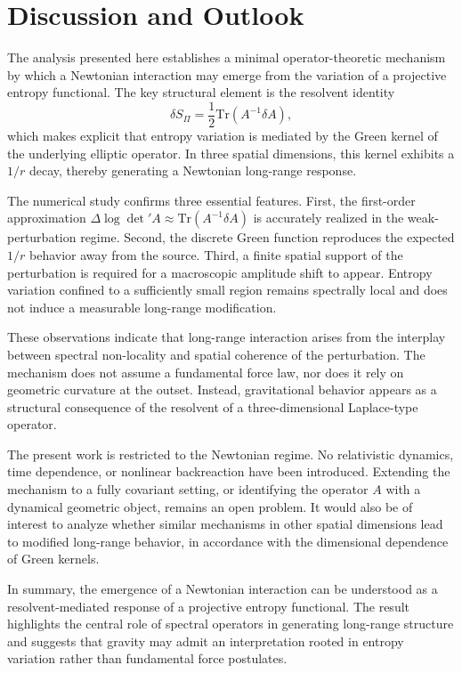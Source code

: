 \section{Discussion and Outlook}
  \label{sec:discussion-and-outlook}

  The analysis presented here establishes a minimal operator-theoretic
  mechanism by which a Newtonian interaction may emerge from the variation
  of a projective entropy functional.
  The key structural element is the resolvent identity
  \begin{equation}
    \delta S_\Pi = \frac12 \mathrm{Tr}(A^{-1}\delta A),
  \end{equation}
  which makes explicit that entropy variation is mediated by the Green kernel
  of the underlying elliptic operator.
  In three spatial dimensions, this kernel exhibits a $1/r$ decay,
  thereby generating a Newtonian long-range response.

  The numerical study confirms three essential features.
  First, the first-order approximation
  $\Delta \log \det{}' A \approx \mathrm{Tr}(A^{-1}\delta A)$
  is accurately realized in the weak-perturbation regime.
  Second, the discrete Green function reproduces the expected $1/r$
  behavior away from the source.
  Third, a finite spatial support of the perturbation is required
  for a macroscopic amplitude shift to appear.
  Entropy variation confined to a sufficiently small region
  remains spectrally local and does not induce a measurable
  long-range modification.

  These observations indicate that long-range interaction arises
  from the interplay between spectral non-locality and spatial coherence
  of the perturbation.
  The mechanism does not assume a fundamental force law,
  nor does it rely on geometric curvature at the outset.
  Instead, gravitational behavior appears as a structural consequence
  of the resolvent of a three-dimensional Laplace-type operator.

  The present work is restricted to the Newtonian regime.
  No relativistic dynamics, time dependence, or nonlinear backreaction
  have been introduced.
  Extending the mechanism to a fully covariant setting,
  or identifying the operator $A$ with a dynamical geometric object,
  remains an open problem.
  It would also be of interest to analyze whether similar mechanisms
  in other spatial dimensions lead to modified long-range behavior,
  in accordance with the dimensional dependence of Green kernels.

  In summary, the emergence of a Newtonian interaction
  can be understood as a resolvent-mediated response of a projective
  entropy functional.
  The result highlights the central role of spectral operators
  in generating long-range structure and suggests that gravity
  may admit an interpretation rooted in entropy variation
  rather than fundamental force postulates.

